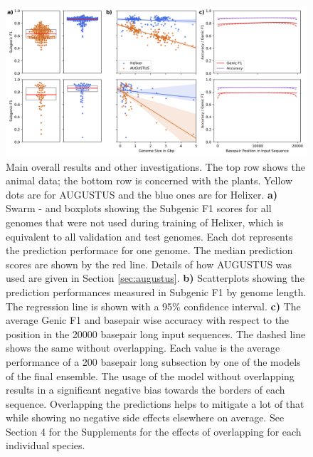 \documentclass{bioinfo}
\begin{document}
\begin{figure}[!tpb]
\label{fig:main_results}
\centerline{\includegraphics[width=\textwidth]{images/main_results}}
\caption{Main overall results and other investigations. The top row shows the animal data; the bottom row is concerned with the plants. Yellow dots are for AUGUSTUS and the blue ones are for Helixer. {\bf a)} Swarm - and boxplots showing the Subgenic F1 scores for all genomes that were not used during training of Helixer, which is equivalent to all validation and test genomes. Each dot represents the prediction performace for one genome. The median prediction scores are shown by the red line. Details of how AUGUSTUS was used are given in Section \ref{sec:augustus}. {\bf b)} Scatterplots showing the prediction performances measured in Subgenic F1 by genome length. The regression line is shown with a 95\% confidence interval. {\bf c)} The average Genic F1 and basepair wise accuracy with respect to the position in the 20000 basepair long input sequences. The dashed line shows the same without overlapping. Each value is the average performance of a 200 basepair long subsection by one of the models of the final ensemble. The usage of the model without overlapping results in a significant negative bias towards the borders of each sequence. Overlapping the predictions helps to mitigate a lot of that while showing no negative side effects elsewhere on average. See Section 4 for the Supplements for the effects of overlapping for each individual species.}
\end{figure}
\end{document}
